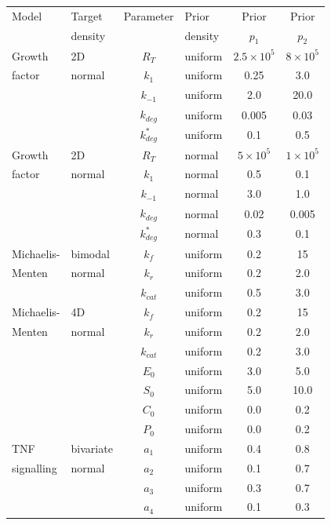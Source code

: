 \begin{table}[H]
\centering
\begin{adjustwidth}{0in}{0in}%
\begin{tabularx}{1.0\textwidth}{llclcc}
Model	& Target  & Parameter & Prior    & Prior  & Prior  \\
        & density &           & density  & $p_1$  & $p_2$  \\
\toprule
Growth  & 2D     & $R_T$       & uniform & $2.5 \times 10^5$ &  $8 \times 10^5$\\
factor  & normal & $k_1$       & uniform & 0.25 & 3.0\\
                && $k_{-1}$    & uniform & 2.0 & 20.0\\
                && $k_{deg}$   & uniform & 0.005 & 0.03\\
                && $k^*_{deg}$ & uniform & 0.1 & 0.5\\
\toprule
Growth  & 2D     & $R_T$ & normal & $5 \times 10^5$ &  $1 \times 10^5$\\
factor  & normal & $k_1$ & normal & 0.5 & 0.1\\
                && $k_{-1}$ & normal & 3.0 & 1.0\\
                && $k_{deg}$ & normal & 0.02 & 0.005\\
                && $k^*_{deg}$ & normal & 0.3 & 0.1\\
\toprule
Michaelis- & bimodal  & $k_f$ & uniform & 0.2 &  15\\
Menten     & normal   & $k_r$ & uniform & 0.2 & 2.0\\
&& $k_{cat}$ & uniform & 0.5 & 3.0\\
\toprule
Michaelis- & 4D    & $k_f$ & uniform & 0.2 &  15\\
Menten     & normal& $k_r$ & uniform & 0.2 & 2.0\\
&& $k_{cat}$ & uniform & 0.2 & 3.0\\
&& $E_0$ & uniform & 3.0 & 5.0\\
&& $S_0$ & uniform & 5.0 & 10.0\\
&& $C_0$ & uniform & 0.0 & 0.2\\
&& $P_0$ & uniform & 0.0 & 0.2\\
\toprule
TNF & bivariate & $a_1$ & uniform & 0.4 & 0.8\\
signalling & normal& $a_2$ & uniform & 0.1 & 0.7\\
&& $a_3$ & uniform & 0.3 & 0.7\\
&& $a_4$ & uniform & 0.1 & 0.3\\

\end{tabularx}
\end{adjustwidth}
\end{table}
